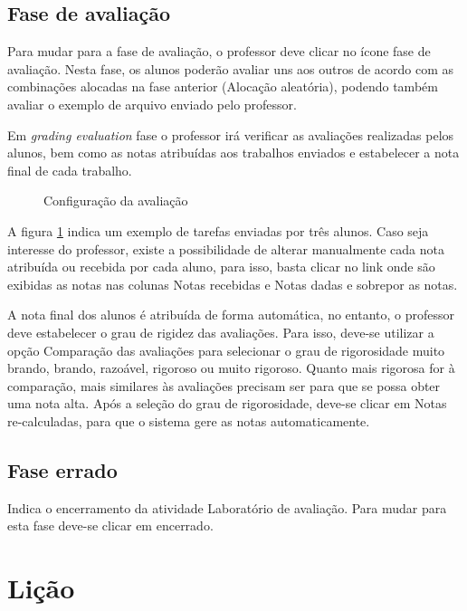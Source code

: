 \subsection{Fase de avaliação}

Para mudar para a fase de avaliação, o professor deve clicar no ícone fase de avaliação. Nesta fase, os alunos poderão avaliar uns aos outros de acordo com as combinações alocadas na fase anterior (Alocação aleatória), podendo também avaliar o exemplo de arquivo enviado pelo professor.

Em \textit{grading evaluation} fase o professor irá verificar as avaliações realizadas pelos alunos, bem como as notas atribuídas aos trabalhos enviados e estabelecer a nota final de cada trabalho.

\begin{figure}
 \begin{center}
  \caption{Configuração da avaliação}
  \label{fig:config_ava2}
 \end{center}
\end{figure}

A figura \ref{fig:config_ava2} indica um exemplo de tarefas enviadas por três alunos. Caso seja interesse do professor, existe a possibilidade de alterar manualmente cada nota atribuída ou recebida por cada aluno, para isso, basta clicar no link onde são exibidas as notas nas colunas Notas recebidas e Notas dadas e sobrepor as notas.

A nota final dos alunos é atribuída de forma automática, no entanto, o professor deve estabelecer o grau de rigidez das avaliações. Para isso, deve-se utilizar a opção Comparação das avaliações para selecionar o grau de rigorosidade muito brando, brando, razoável, rigoroso ou muito rigoroso. Quanto mais rigorosa for à comparação, mais similares às avaliações precisam ser para que se possa obter uma nota alta. Após a seleção do grau de rigorosidade, deve-se clicar em Notas re-calculadas, para que o sistema gere as notas automaticamente.

\subsection{Fase errado}

Indica o encerramento da atividade Laboratório de avaliação. Para mudar para esta fase deve-se clicar em encerrado.

\section{Lição}

